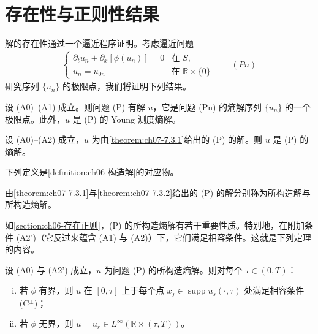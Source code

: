 \documentclass[../../main.tex]{subfiles}%
\begin{document}
\section{存在性与正则性结果}\label{section:ch07-存在性}

解的存在性通过一个逼近程序证明。考虑逼近问题
\begin{align*}
\begin{cases}
\partial_t u_n+\partial_x[\phi(u_n)]=0 & \text{在 }S,\\
u_n=u_{0n} & \text{在 }\mathbb{R}\times\{0\}
\end{cases}
\qquad(Pn)
\end{align*}
研究序列 $\{u_n\}$ 的极限点，我们将证明下列结果。

\begin{theorem}\label{theorem:ch07-7.3.1}
设 (A0)--(A1) 成立。则问题 (P) 有解 $u$，它是问题 (Pn) 的熵解序列 $\{u_n\}$ 的一个极限点。此外，$u$ 是 (P) 的 Young 测度熵解。
\end{theorem}

\begin{theorem}\label{theorem:ch07-7.3.2}
设 (A0)--(A2) 成立，$u$ 为由\cref{theorem:ch07-7.3.1}给出的 (P) 的解。则 $u$ 是 (P) 的熵解。
\end{theorem}

下列定义是\cref{definition:ch06-构造解}的对应物。

\begin{definition}\label{definition:ch07-构造解}
由\cref{theorem:ch07-7.3.1}与\cref{theorem:ch07-7.3.2}给出的 (P) 的解分别称为所构造解与所构造熵解。
\end{definition}

如\cref{section:ch06-存在正则}，(P) 的所构造熵解有若干重要性质。特别地，在附加条件 (A2')（它反过来蕴含 (A1) 与 (A2)）下，它们满足相容条件。这就是下列定理的内容。

\begin{theorem}\label{theorem:ch07-7.3.3}
设 (A0) 与 (A2') 成立，$u$ 为问题 (P) 的所构造熵解。则对每个 $\tau\in(0,T)$：
\begin{enumerate}[(i)]
\item 若 $\phi$ 有界，则 $u$ 在 $[0,\tau]$ 上于每个点 $x_j\in\operatorname{supp}u_s(\cdot,\tau)$ 处满足相容条件 (C$^\pm$)；
\item 若 $\phi$ 无界，则 $u=u_r\in L^\infty(\mathbb{R}\times(\tau,T))$。
\end{enumerate}
\end{theorem}
\end{document}
